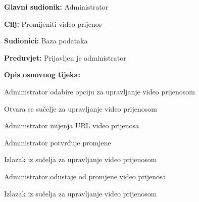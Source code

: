 					\noindent {}
					\begin{packed_item}
						
						\item \textbf{Glavni sudionik: }Administrator
						\item  \textbf{Cilj:} Promijeniti video prijenos
						\item  \textbf{Sudionici:} Baza podataka
						\item  \textbf{Preduvjet:} Prijavljen je administrator
						\item  \textbf{Opis osnovnog tijeka:}
						
						\item[] \begin{packed_enum}
							
							\item Administrator odabire opciju za upravljanje video prijenosom
							\item Otvara se sučelje za upravljanje video prijenosom
							\item Administrator mijenja URL video prijenosa
							\item Administrator potvrđuje promjene
							\item Izlazak iz sučelja za upravljanje video prijenosom
						\end{packed_enum}
						
						\item[] \begin{packed_item}
							
							\item[4.a] Administrator odustaje od promjene video prijenosa
							\item[] \begin{packed_enum}
								
								\item Izlazak iz sučelja za upravljanje video prijenosom
								
							\end{packed_enum}
							
						\end{packed_item}
						
					\end{packed_item}
					
